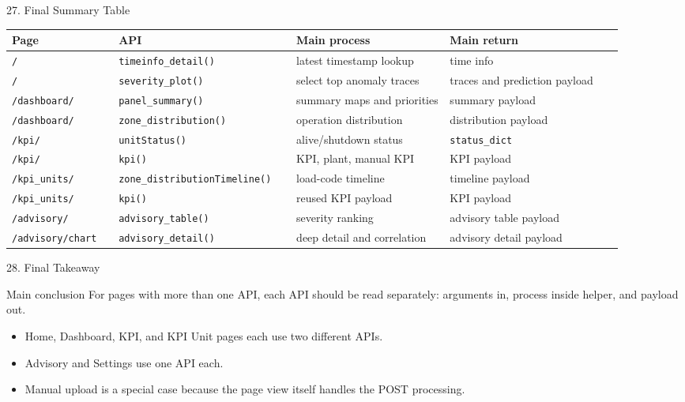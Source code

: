 \documentclass[aspectratio=169]{beamer}
\begin{document}
\begin{frame}{27. Final Summary Table}
\small
\centering
\begin{tabular}{>{\RaggedRight}p{0.16\linewidth}>{\RaggedRight}p{0.25\linewidth}>{\RaggedRight}p{0.23\linewidth}>{\RaggedRight\arraybackslash}p{0.26\linewidth}}
\toprule
Page & API & Main process & Main return \\
\midrule
\texttt{/} & \texttt{timeinfo\_detail()} & latest timestamp lookup & time info \\
\texttt{/} & \texttt{severity\_plot()} & select top anomaly traces & traces and prediction payload \\
\texttt{/dashboard/} & \texttt{panel\_summary()} & summary maps and priorities & summary payload \\
\texttt{/dashboard/} & \texttt{zone\_distribution()} & operation distribution & distribution payload \\
\texttt{/kpi/} & \texttt{unitStatus()} & alive/shutdown status & \texttt{status\_dict} \\
\texttt{/kpi/} & \texttt{kpi()} & KPI, plant, manual KPI & KPI payload \\
\texttt{/kpi\_units/} & \texttt{zone\_distributionTimeline()} & load-code timeline & timeline payload \\
\texttt{/kpi\_units/} & \texttt{kpi()} & reused KPI payload & KPI payload \\
\texttt{/advisory/} & \texttt{advisory\_table()} & severity ranking & advisory table payload \\
\texttt{/advisory/chart} & \texttt{advisory\_detail()} & deep detail and correlation & advisory detail payload \\
\bottomrule
\end{tabular}
\end{frame}

\begin{frame}{28. Final Takeaway}
\justifying
\begin{alertblock}{Main conclusion}
For pages with more than one API, each API should be read separately: arguments in, process inside helper, and payload out.
\end{alertblock}

\begin{itemize}
    \item Home, Dashboard, KPI, and KPI Unit pages each use two different APIs.
    \item Advisory and Settings use one API each.
    \item Manual upload is a special case because the page view itself handles the POST processing.
\end{itemize}
\end{frame}
\end{document}
